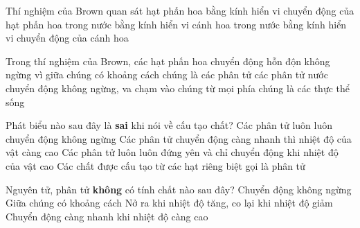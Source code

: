 \begin{ex}
	Thí nghiệm của Brown quan sát
	\choice
	{hạt phấn hoa bằng kính hiển vi}
	{\True chuyển động của hạt phấn hoa trong nước bằng kính hiển vi}
	{cánh hoa trong nước bằng kính hiển vi}
	{chuyển động của cánh hoa}
\end{ex}
\begin{ex}
	Trong thí nghiệm của Brown, các hạt phấn hoa chuyển động hỗn độn không ngừng vì
	\choice
	{giữa chúng có khoảng cách}
	{chúng là các phân tử}
	{\True các phân tử nước chuyển động không ngừng, va chạm vào chúng từ mọi phía}
	{chúng là các thực thể sống}
\end{ex}

\begin{ex}
	Phát biểu nào sau đây là \textbf{sai} khi nói về cấu tạo chất?	
	\choice
	{Các phân tử luôn luôn chuyển động không ngừng}
	{Các phân tử chuyển động càng nhanh thì nhiệt độ của vật càng cao}
	{\True Các phân tử luôn luôn đứng yên và chỉ chuyển động khi nhiệt độ của vật cao}
	{Các chất được cấu tạo từ các hạt riêng biệt gọi là phân tử}
\end{ex}

\begin{ex}
	Nguyên tử, phân tử \textbf{không} có tính chất nào sau đây?
	\choice
	{Chuyển động không ngừng}
	{Giữa chúng có khoảng cách}
	{\True Nở ra khi nhiệt độ tăng, co lại khi nhiệt độ giảm}
	{Chuyển động càng nhanh khi nhiệt độ càng cao}
\end{ex}

